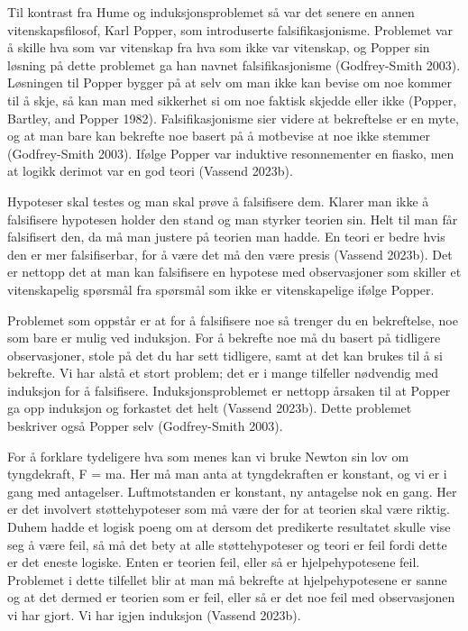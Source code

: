 \documentclass[
  letterpaper,
  DIV=11,
  numbers=noendperiod]{scrreprt}
\begin{document}
Til kontrast fra Hume og induksjonsproblemet så var det senere en annen
vitenskapsfilosof, Karl Popper, som introduserte falsifikasjonisme.
Problemet var å skille hva som var vitenskap fra hva som ikke var
vitenskap, og Popper sin løsning på dette problemet ga han navnet
falsifikasjonisme (Godfrey-Smith 2003). Løsningen til Popper bygger på
at selv om man ikke kan bevise om noe kommer til å skje, så kan man med
sikkerhet si om noe faktisk skjedde eller ikke (Popper, Bartley, and
Popper 1982). Falsifikasjonisme sier videre at bekreftelse er en myte,
og at man bare kan bekrefte noe basert på å motbevise at noe ikke
stemmer (Godfrey-Smith 2003). Ifølge Popper var induktive resonnementer
en fiasko, men at logikk derimot var en god teori (Vassend 2023b).

Hypoteser skal testes og man skal prøve å falsifisere dem. Klarer man
ikke å falsifisere hypotesen holder den stand og man styrker teorien
sin. Helt til man får falsifisert den, da må man justere på teorien man
hadde. En teori er bedre hvis den er mer falsifiserbar, for å være det
må den være presis (Vassend 2023b). Det er nettopp det at man kan
falsifisere en hypotese med observasjoner som skiller et vitenskapelig
spørsmål fra spørsmål som ikke er vitenskapelige ifølge Popper.

Problemet som oppstår er at for å falsifisere noe så trenger du en
bekreftelse, noe som bare er mulig ved induksjon. For å bekrefte noe må
du basert på tidligere observasjoner, stole på det du har sett
tidligere, samt at det kan brukes til å si bekrefte. Vi har alstå et
stort problem; det er i mange tilfeller nødvendig med induksjon for å
falsifisere. Induksjonsproblemet er nettopp årsaken til at Popper ga opp
induksjon og forkastet det helt (Vassend 2023b). Dette problemet
beskriver også Popper selv (Godfrey-Smith 2003).

For å forklare tydeligere hva som menes kan vi bruke Newton sin lov om
tyngdekraft, F = ma. Her må man anta at tyngdekraften er konstant, og vi
er i gang med antagelser. Luftmotstanden er konstant, ny antagelse nok
en gang. Her er det involvert støttehypoteser som må være der for at
teorien skal være riktig. Duhem hadde et logisk poeng om at dersom det
predikerte resultatet skulle vise seg å være feil, så må det bety at
alle støttehypoteser og teori er feil fordi dette er det eneste logiske.
Enten er teorien feil, eller så er hjelpehypotesene feil. Problemet i
dette tilfellet blir at man må bekrefte at hjelpehypotesene er sanne og
at det dermed er teorien som er feil, eller så er det noe feil med
observasjonen vi har gjort. Vi har igjen induksjon (Vassend 2023b).
\end{document}
